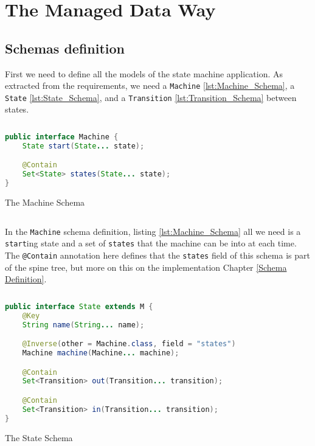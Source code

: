 \section{The Managed Data Way}

\subsection{Schemas definition}
First we need to define all the models of the state machine application. 
As extracted from the requirements, we need a \texttt{Machine} \ref{lst:Machine_Schema}, a \texttt{State} \ref{lst:State_Schema}, and a \texttt{Transition} \ref{lst:Transition_Schema} between states.

\begin{sourcecode}
	\begin{lstlisting}[language=Java,escapechar=|]
public interface Machine {
	State start(State... state);

	@Contain
	Set<State> states(State... state);
}
	\end{lstlisting}
	\caption{The Machine Schema}
	\label{lst:Machine_Schema}
\end{sourcecode}

In the \texttt{Machine} schema definition, listing \ref{lst:Machine_Schema} all we need is a \texttt{start}ing state and a set of \texttt{states} that the machine can be into at each time.
The \texttt{@Contain} annotation here defines that the \texttt{states} field of this schema is part of the spine tree, but more on this on the implementation Chapter \ref{Schema Definition}.

\begin{sourcecode}[H]
	\begin{lstlisting}[language=Java,escapechar=|]
public interface State extends M {
	@Key
	String name(String... name);

	@Inverse(other = Machine.class, field = "states")
	Machine machine(Machine... machine);

	@Contain
	Set<Transition> out(Transition... transition);

	@Contain
	Set<Transition> in(Transition... transition);
}
	\end{lstlisting}
	\caption{The State Schema}
	\label{lst:State_Schema}
\end{sourcecode}

